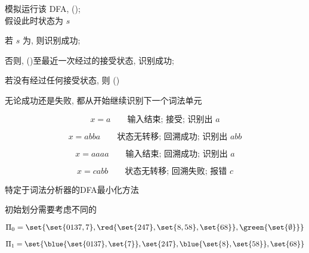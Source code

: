 \begin{frame}{}
  \begin{center}
    模拟运行该 DFA,  (); \\[3pt]
    假设此时状态为 $s$


    \pause
    若 $s$ 为, 则识别成功;

    \pause
    \vspace{0.30cm}
    否则,  ()至最近一次经过的接受状态, 识别成功;

    \pause
    \vspace{0.30cm}
    若没有经过任何接受状态, 则 ()

    \pause
    \vspace{0.30cm}
    无论成功还是失败, 都从开始继续识别下一个词法单元
  \end{center}
\end{frame}

\begin{frame}

  \[
    x = a \qquad \text{输入结束; 接受; 识别出 $a$}
  \]

  \pause
  \vspace{-0.40cm}
  \[
    x = abba \qquad \text{状态无转移; 回溯成功; 识别出 $abb$}
  \]

  \pause
  \vspace{-0.40cm}
  \[
    x = aaaa \qquad \text{输入结束; 回溯成功; 识别出 $a$}
  \]

  \pause
  \vspace{-0.40cm}
  \[
    x = cabb \qquad \text{状态无转移; 回溯失败; 报错 $c$}
  \]
\end{frame}

\begin{frame}{}
  \begin{center}
    特定于词法分析器的DFA最小化方法


    \vspace{0.30cm}
    初始划分需要考虑不同的

    \vspace{-0.50cm}
    \[
      \Pi_{0} = \set{\set{0137, 7}, \red{\set{247}, \set{8, 58}, \set{68}},
        \green{\set{\emptyset}}}
    \]

    \pause
    \vspace{-1.00cm}
    \[
      \Pi_{1} = \set{\blue{\set{0137}, \set{7}}, \set{247}, \blue{\set{8}, \set{58}},
        \set{68}}
    \]
  \end{center}
\end{frame}

